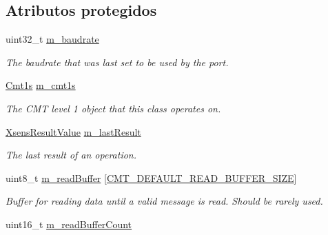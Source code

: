 \subsection*{\-Atributos protegidos}
\begin{DoxyCompactItemize}
\item 
\hypertarget{classxsens_1_1Cmt2s_a2ad06dcfe1a3807ec8456cc88f64750b}{uint32\-\_\-t \hyperlink{classxsens_1_1Cmt2s_a2ad06dcfe1a3807ec8456cc88f64750b}{m\-\_\-baudrate}}\label{classxsens_1_1Cmt2s_a2ad06dcfe1a3807ec8456cc88f64750b}

\begin{DoxyCompactList}\small\item\em \-The baudrate that was last set to be used by the port. \end{DoxyCompactList}\item 
\hypertarget{classxsens_1_1Cmt2s_a825a3557e45cdd635c2d1f68fda197ff}{\hyperlink{classxsens_1_1Cmt1s}{\-Cmt1s} \hyperlink{classxsens_1_1Cmt2s_a825a3557e45cdd635c2d1f68fda197ff}{m\-\_\-cmt1s}}\label{classxsens_1_1Cmt2s_a825a3557e45cdd635c2d1f68fda197ff}

\begin{DoxyCompactList}\small\item\em \-The \-C\-M\-T level 1 object that this class operates on. \end{DoxyCompactList}\item 
\hypertarget{classxsens_1_1Cmt2s_abacfa56aa9ba72212e29817c52aa143b}{\hyperlink{group__enums_ga822a2260a20af524029eef9e9a51ff6f}{\-Xsens\-Result\-Value} \hyperlink{classxsens_1_1Cmt2s_abacfa56aa9ba72212e29817c52aa143b}{m\-\_\-last\-Result}}\label{classxsens_1_1Cmt2s_abacfa56aa9ba72212e29817c52aa143b}

\begin{DoxyCompactList}\small\item\em \-The last result of an operation. \end{DoxyCompactList}\item 
\hypertarget{classxsens_1_1Cmt2s_acfd8b33fbd51b4b668cd4eb55ba440e9}{uint8\-\_\-t \hyperlink{classxsens_1_1Cmt2s_acfd8b33fbd51b4b668cd4eb55ba440e9}{m\-\_\-read\-Buffer} \mbox{[}\hyperlink{cmtdef_8h_a59c570baa7aed9a7ca80039ea2eddef7}{\-C\-M\-T\-\_\-\-D\-E\-F\-A\-U\-L\-T\-\_\-\-R\-E\-A\-D\-\_\-\-B\-U\-F\-F\-E\-R\-\_\-\-S\-I\-Z\-E}\mbox{]}}\label{classxsens_1_1Cmt2s_acfd8b33fbd51b4b668cd4eb55ba440e9}

\begin{DoxyCompactList}\small\item\em \-Buffer for reading data until a valid message is read. \-Should be rarely used. \end{DoxyCompactList}\item 
\hypertarget{classxsens_1_1Cmt2s_afd3d5a87b16c88bdaca52e0ee4a423ad}{uint16\-\_\-t \hyperlink{classxsens_1_1Cmt2s_afd3d5a87b16c88bdaca52e0ee4a423ad}{m\-\_\-read\-Buffer\-Count}}\label{classxsens_1_1Cmt2s_afd3d5a87b16c88bdaca52e0ee4a423ad}


\end{DoxyCompactItemize}
